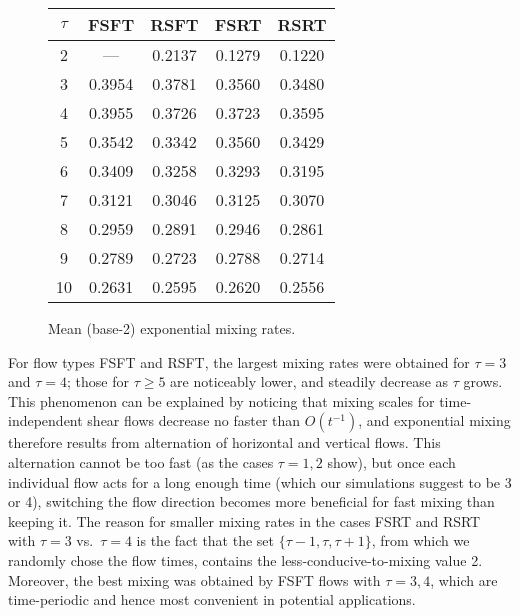 \documentclass[12pt]{article}
\numberwithin{figure}{section}
\numberwithin{equation}{section}
\begin{document}

\begin{figure}[htbp]
\centering    
\begin{tabular}{|c|c|c|c|c|}
	\hline
	$\tau$ & FSFT & RSFT & FSRT & RSRT \\\hline\hline
	2 & --- & 0.2137 & 0.1279 & 0.1220 \\\hline
	3 & 0.3954 & 0.3781 & 0.3560 & 0.3480 \\\hline
	4 & 0.3955 & 0.3726 & 0.3723 & 0.3595 \\\hline
	5 & 0.3542 & 0.3342 & 0.3560 & 0.3429 \\\hline
	6 & 0.3409 & 0.3258 & 0.3293 & 0.3195 \\\hline
	7 & 0.3121 & 0.3046 & 0.3125 & 0.3070 \\\hline
	8 & 0.2959 & 0.2891 & 0.2946 & 0.2861 \\\hline
	9 & 0.2789 & 0.2723 & 0.2788 & 0.2714 \\\hline
	10 & 0.2631 & 0.2595 & 0.2620 & 0.2556 \\\hline
\end{tabular}
    \caption{Mean  (base-2) exponential mixing rates.}
    \label{main_data}
\end{figure}





For flow types FSFT and RSFT, the largest mixing rates were obtained for $\tau=3$ and $\tau=4$; those for $\tau\ge 5$ are noticeably lower, and steadily decrease as $\tau$ grows.  This phenomenon can be explained by noticing that mixing scales for time-independent shear flows decrease no faster than $O(t^{-1})$, and exponential mixing therefore results from alternation of horizontal and vertical flows.  This alternation cannot be too fast (as the cases $\tau=1,2$ show), but once each individual flow acts for a long enough time (which our simulations suggest to be 3 or 4), switching the flow direction becomes more beneficial for fast mixing than keeping it.  The reason for smaller mixing rates in the cases FSRT and RSRT with $\tau=3$ vs.~$\tau=4$ is the fact that the set  $\{\tau-1,\tau,\tau+1\}$, from which we randomly chose the flow times, contains the less-conducive-to-mixing value 2.  
Moreover, the best mixing was obtained by FSFT flows with $\tau=3,4$, which are time-periodic and hence most convenient in potential applications.
\end{document}
